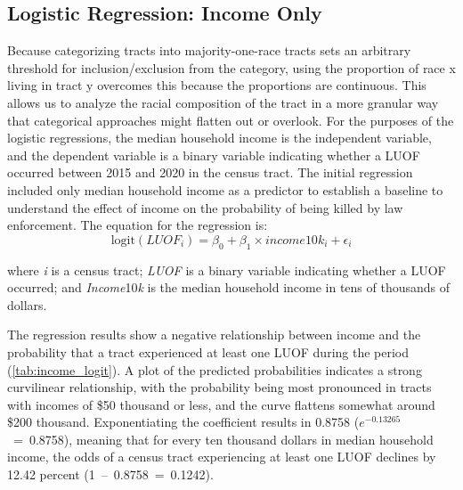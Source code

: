\documentclass[12pt]{article}
\begin{document}
\subsection{Logistic Regression: Income Only}

Because categorizing tracts into majority-one-race tracts sets an arbitrary threshold for inclusion/exclusion from the category, using the proportion of race x living in tract y overcomes this because the proportions are continuous. This allows us to analyze the racial composition of the tract in a more granular way that categorical approaches might flatten out or overlook. For the purposes of the logistic regressions, the median household income is the independent variable, and the dependent variable is a binary variable indicating whether a LUOF occurred between 2015 and 2020 in the census tract. The initial regression included only median household income as a predictor to establish a baseline to understand the effect of income on the probability of being killed by law enforcement. The equation for the regression is:
\begin{equation}
\text{logit}(LUOF_{i})=\beta_{0} + \beta_{1} \times income10k_{i} + \epsilon_{i}
\end{equation}

\noindent{}where \textit{i} is a census tract; \textit{LUOF} is a binary variable indicating whether a LUOF occurred; and \textit{Income}10\textit{k} is the median household income in tens of thousands of dollars.

The regression results show a negative relationship between income and the probability that a tract experienced at least one LUOF during the period (\autoref{tab:income_logit}). A plot of the predicted probabilities indicates a strong curvilinear relationship, with the probability being most pronounced in tracts with incomes of \$50 thousand or less, and the curve flattens somewhat around \$200 thousand. Exponentiating the coefficient results in 0.8758 ($e^{-0.13265}$~=~0.8758), meaning that for every ten thousand dollars in median household income, the odds of a census tract experiencing at least one LUOF declines by 12.42 percent (1~--~0.8758~=~0.1242).
\end{document}
